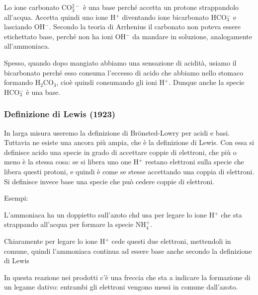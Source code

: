 \vspace{0.2cm}Lo ione carbonato CO$_3^{2-}$ è una base perché accetta un protone strappandolo all'acqua. Accetta quindi uno ione H$^+$ diventando ione bicarbonato HCO$_3^-$ e lasciando OH$^-$. Secondo la teoria di Arrhenius il carbonato non poteva essere etichettato base, perché non ha ioni OH$^-$ da mandare in soluzione, analogamente all'ammoniaca.

Spesso, quando dopo mangiato abbiamo una sensazione di acidità, usiamo il bicarbonato perché esso consuma l'eccesso di acido che abbiamo nello stomaco formando H$_2$CO$_3$, cioè quindi consumando gli ioni H$^+$. Dunque anche la specie HCO$_3^-$ è una base.

\subsubsection{Definizione di Lewis (1923)}
In larga misura useremo la definizione di Brönsted-Lowry per acidi e basi. Tuttavia ne esiste una ancora più ampia, che è la definizione di Lewis. Con essa si definisce acido una specie in grado di accettare coppie di elettroni, che più o meno è la stessa cosa: se si libera uno one H$^+$ restano elettroni sulla specie che libera questi protoni, e quindi è come se stesse accettando una coppia di elettroni. Si definisce invece base una specie che può cedere coppie di elettroni.

\vspace{0.2cm}Esempi:

\vspace{0.2cm} 

\vspace{0.2cm}L'ammoniaca ha un doppietto sull'azoto chd usa per legare lo ione H$^+$ che sta strappando all'acqua per formare la specie NH$_4^+$.

Chiaramente per legare lo ione H$^+$ cede questi due elettroni, mettendoli in comune, quindi l'ammoniaca continua ad essere base anche secondo la definizione di Lewis

\vspace{0.2cm}  

\vspace{0.2cm}In questa reazione nei prodotti c'è una freccia che sta a indicare la formazione di un legame dativo: entrambi gli elettroni vengono messi in comune dall'azoto.

